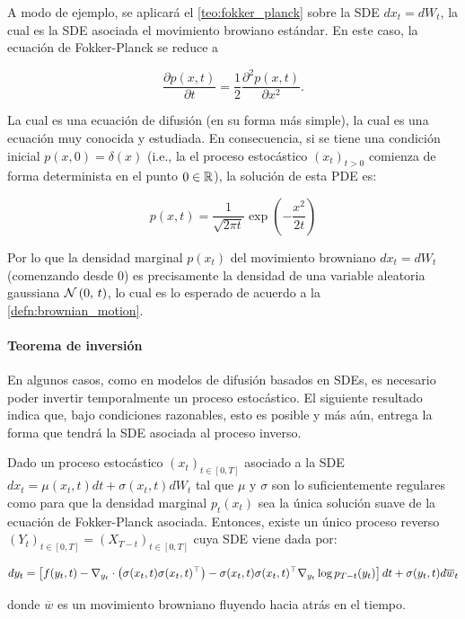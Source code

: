 A modo de ejemplo, se aplicará el \autoref{teo:fokker_planck} sobre la SDE $dx_{t}= dW_t$, la cual es la SDE asociada el movimiento browiano estándar. En este caso, la ecuación de Fokker-Planck se reduce a

\begin{equation}
    \frac{\partial p(x,t)}{\partial t} = \frac{1}{2} \frac{\partial^{2}p(x, t)}{\partial x^2}.
\end{equation}

La cual es una ecuación de difusión (en su forma más simple), la cual es una ecuación muy conocida y estudiada. En consecuencia, si se tiene una condición inicial $p(x,0)=\delta(x)$ (i.e., la el proceso estocástico $(x_t)_{t>0}$ comienza de forma determinista en el punto $0\in\mathbb{R}$), la solución de esta PDE es:

\begin{equation}
    p(x,t) = \frac{1}{\sqrt{2\pi t}} \exp\left(-\frac{x^2}{2t}\right)
\end{equation}

Por lo que la densidad marginal $p(x_t)$ del movimiento browniano $dx_{t}= dW_t$ (comenzando desde 0) es precisamente la densidad de una variable aleatoria gaussiana $\mathcal{N}\left(0,\,t\right)$, lo cual es lo esperado de acuerdo a la \autoref{defn:brownian_motion}.

\paragraph{Teorema de inversión}

En algunos casos, como en modelos de difusión basados en SDEs, es necesario poder invertir temporalmente un proceso estocástico. El siguiente resultado indica que, bajo condiciones razonables, esto es posible y más aún, entrega la forma que tendrá la SDE asociada al proceso inverso.

\begin{teo}
    \label{teo:anderson}
    Dado un proceso estocástico $(x_t)_{t\in[0,T]}$ asociado a la SDE $dx_t=\mu(x_t,t)dt+\sigma(x_t,t)dW_t$ tal que $\mu$ y $\sigma$ son lo suficientemente regulares como para que la densidad marginal $p_t(x_t)$ sea la única solución suave de la ecuación de Fokker-Planck asociada. Entonces, existe un único proceso reverso $(Y_t)_{t\in[0,T]}=(X_{T-t})_{t\in[0,T]}$ cuya SDE viene dada por:

    \begin{equation}
        dy_t = \left[f(y_t,t) - \nabla_{y_t}\cdot\left(\sigma(x_t,t)\sigma(x_t,t)^\top\right) - \sigma(x_t,t)\sigma(x_t,t)^\top \nabla_{y_t} \log p_{T-t}(y_t)\right]dt + \sigma(y_t,t)d\overline{w}_t
        \label{eq:reverse_sde}
    \end{equation}

    donde $\overline{w}$ es un movimiento browniano fluyendo hacia atrás en el tiempo.
\end{teo}

